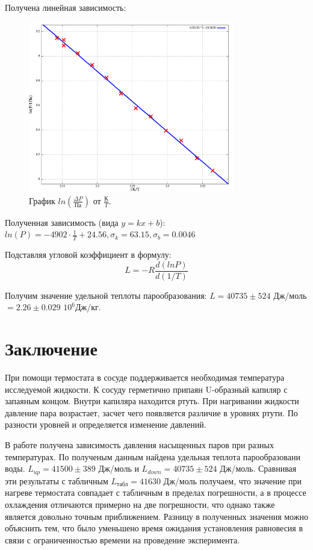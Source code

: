 \documentclass[a4paper,10pt]{article} %
\begin{document}
Получена линейная зависимость: 
\begin{figure}[H]
	\centering
	\includegraphics[width=0.8\textwidth]{2-4-1-4-res.png}
	\caption{График $ln(\frac{\Delta P}{\text{Па}})$ от $\frac{\text{К}}{T}$.}
\end{figure}


Полученная зависимость (вида $y = kx + b$): $ln(P) = -4902\cdot \frac{1}{T} + 24.56, \sigma_k = 63.15, 
\sigma_b = 0.0046$


Подставляя угловой коэффициент в формулу:
\[ L = -R\frac{d(lnP)}{d(1/T)} \]

Получим значение удельной теплоты парообразования: $L = 40735 \pm 524$ Дж/моль $= 2.26 \pm 0.029$ $10^6$Дж/кг.




\section{Заключение}

	При помощи термостата в  сосуде поддерживается необходимая температура исследуемой жидкости. К сосуду герметично 
	припаян U-образный капиляр с запаяным концом. Внутри капиляра находится ртуть. При нагривании жидкости давление 
	пара возрастает, засчет чего появляется различие в уровнях ртути. По разности уровней и определяется изменение давлений. 

	В работе получена зависимость давления насыщенных паров при разных температурах. По полученым данным найдена удельная 
	теплота парообразовани воды. $L_{up} = 41500 \pm 389$ Дж/моль и $L_{down} = 40735 \pm 524$ Дж/моль. Сравнивая эти 
	результаты с табличным $L_{\text{табл}} = 41630$ Дж/моль получаем, что значение при нагреве термостата совпадает с 
	табличным в пределах погрешности, а в процессе охлаждения отличаются примерно на две погрешности, что однако также 
	является довольно точным приближением. Разницу в полученных значения можно объяснить тем, что было уменьшено время 
	ожидания установления равновесия в связи с ограниченностью времени на проведение эксперимента.
\end{document}
